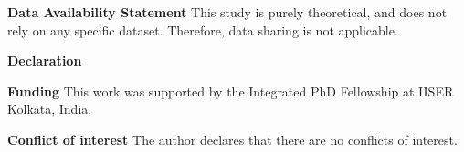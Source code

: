 \documentclass[10pt, reqno]{amsart}
\numberwithin{equation}{section}
\begin{document}
\bigskip


\bigskip


\noindent \textbf{Data Availability Statement} This study is purely theoretical, and does not rely on any specific dataset. Therefore, data sharing is not applicable. 



\noindent \textbf{Declaration}


\noindent \textbf{Funding} This work was supported by the Integrated PhD Fellowship at IISER Kolkata, India.

\noindent \textbf{Conflict of interest} The author declares that there are no conflicts of interest.
































\newpage
\end{document}
